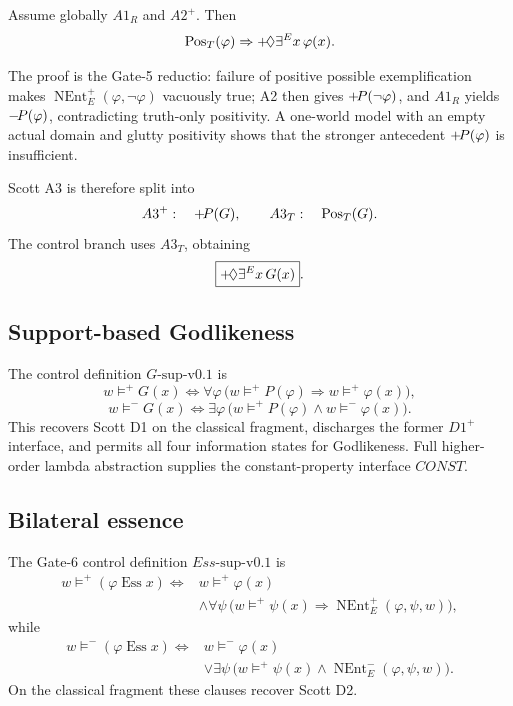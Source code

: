 \begin{theorem}
Assume globally \(A1_R\) and \(A2^+\). Then
\[
  \operatorname{Pos}_{T}(\varphi)
  \Rightarrow
  +\!\Diamond\exists^E x\,\varphi(x).
\]
\end{theorem}

The proof is the Gate-5 reductio: failure of positive possible exemplification makes \(\operatorname{NEnt}^{+}_{E}(\varphi,\neg\varphi)\) vacuously true; A2 then gives \(+\!P(\neg\varphi)\), and \(A1_R\) yields \(-\!P(\varphi)\), contradicting truth-only positivity. A one-world model with an empty actual domain and glutty positivity shows that the stronger antecedent \(+\!P(\varphi)\) is insufficient.

Scott A3 is therefore split into
\[
  A3^+:\quad +\!P(G),
  \qquad
  A3_T:\quad \operatorname{Pos}_{T}(G).
\]
The control branch uses \(A3_T\), obtaining
\[
  \boxed{+\!\Diamond\exists^E x\,G(x)}.
\]

\subsection{Support-based Godlikeness}

The control definition \(G\text{-sup-v0.1}\) is
\[
  w\models^+G(x)
  \Longleftrightarrow
  \forall\varphi\,
  \bigl(w\models^+P(\varphi)\Rightarrow w\models^+\varphi(x)\bigr),
\]
\[
  w\models^-G(x)
  \Longleftrightarrow
  \exists\varphi\,
  \bigl(w\models^+P(\varphi)\land w\models^-\varphi(x)\bigr).
\]
This recovers Scott D1 on the classical fragment, discharges the former \(D1^+\) interface, and permits all four information states for Godlikeness. Full higher-order lambda abstraction supplies the constant-property interface \(CONST\).

\subsection{Bilateral essence}

The Gate-6 control definition \(Ess\text{-sup-v0.1}\) is
\[
\begin{split}
  w\models^+(\varphi\operatorname{Ess}x)
  \Longleftrightarrow{}&
  w\models^+\varphi(x)\\
  &\land
  \forall\psi\,
  \bigl(w\models^+\psi(x)
  \Rightarrow
  \operatorname{NEnt}^{+}_{E}(\varphi,\psi,w)\bigr),
\end{split}
\]
while
\[
\begin{split}
  w\models^-(\varphi\operatorname{Ess}x)
  \Longleftrightarrow{}&
  w\models^-\varphi(x)\\
  &\lor
  \exists\psi\,
  \bigl(w\models^+\psi(x)
  \land
  \operatorname{NEnt}^{-}_{E}(\varphi,\psi,w)\bigr).
\end{split}
\]
On the classical fragment these clauses recover Scott D2.

